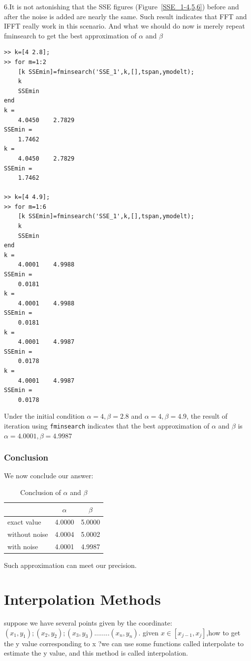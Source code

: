 \documentclass[a4paper]{article}
\begin{document}
6.It is not astonishing that the SSE figures (Figure~\ref{SSE_1-4,5,6}) before and after the noise is added are nearly the same. Such result indicates that FFT and IFFT really work in this scenario. And what we should do now is merely repeat fminsearch to get the best approximation of $\alpha$ and $\beta$
\begin{verbatim}
>> k=[4 2.8];
>> for m=1:2
    [k SSEmin]=fminsearch('SSE_1',k,[],tspan,ymodelt);
    k
    SSEmin
end
k =
    4.0450    2.7829
SSEmin =
    1.7462
k =
    4.0450    2.7829
SSEmin =
    1.7462

>> k=[4 4.9];
>> for m=1:6
    [k SSEmin]=fminsearch('SSE_1',k,[],tspan,ymodelt);
    k
    SSEmin
end
k =
    4.0001    4.9988
SSEmin =
    0.0181
k =
    4.0001    4.9988
SSEmin =
    0.0181
k =
    4.0001    4.9987
SSEmin =
    0.0178
k =
    4.0001    4.9987
SSEmin =
    0.0178
\end{verbatim}
Under the initial condition $\alpha=4,\beta=2.8$ and $\alpha=4,\beta=4.9$, the result of iteration using \verb$fminsearch$ indicates that the best approximation of $\alpha$ and $\beta$ is $\alpha=4.0001,\beta=4.9987$

\subsubsection{Conclusion}
We now conclude our answer:


\begin{table}[htbp]
\label{34}
\centering
\caption{Conclusion of $\alpha$ and $\beta$}
\begin{tabular}{lcc}
\toprule
              &  $\alpha$ &   $\beta$ \\
\midrule
exact value   &   4.0000  &    5.0000 \\
without noise &   4.0004  &    5.0002 \\
with noise    &   4.0001  &    4.9987 \\
\bottomrule
\end{tabular}
\end{table}

Such approximation can meet our precision.\\
\section{Interpolation Methods}
suppose we have several points given by the coordinate: $(x_{1},y_{1});(x_{2},y_{2});(x_{3},y_{3})........(x_{n},y_{n})$. given $x\in[x_{j-1},x_{j}]$,how to get the y value corresponding to x ?we can use some functions called interpolate to estimate the y value, and this method is called interpolation.
\end{document}
